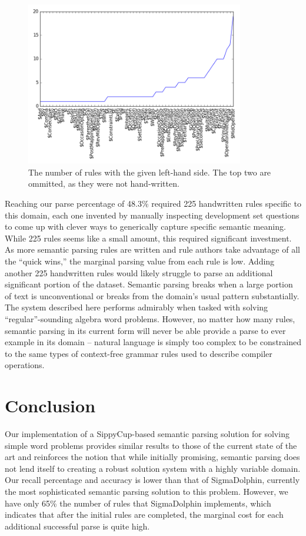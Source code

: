 \documentclass[11pt]{article}
\begin{document}
\begin{figure}[t]
    \centering
    \includegraphics[width=0.85\textwidth]{rules-bottom.png}
    \caption{The number of rules with the given left-hand side. The top two are ommitted, as they were not hand-written.}
    \label{fig:chart}
\end{figure}

Reaching our parse percentage of 48.3\% required 225 handwritten rules specific to this domain, each one invented by manually inspecting development set questions to come up with clever ways to generically capture specific semantic meaning. While 225 rules seems like a small amount, this required significant investment. As more semantic parsing rules are written and rule authors take advantage of all the ``quick wins,'' the marginal parsing value from each rule is low. Adding another 225 handwritten rules would likely struggle to parse an additional significant portion of the dataset.
Semantic parsing breaks when a large portion of text is unconventional or breaks from the domain's usual pattern substantially. The system described here performs admirably when tasked with solving ``regular''-sounding algebra word problems. However, no matter how many rules, semantic parsing in its current form will never be able provide a parse to ever example in its domain -- natural language is simply too complex to be constrained to the same types of context-free grammar rules used to describe compiler operations.


\section{Conclusion}
Our implementation of a SippyCup-based semantic parsing solution for solving simple word problems provides similar results to those of the current state of the art and reinforces the notion that while initially promising, semantic parsing does not lend itself to creating a robust solution system with a highly variable domain. Our recall percentage and accuracy is lower than that of SigmaDolphin, currently the most sophisticated semantic parsing solution to this problem. However, we have only 65\% the number of rules that SigmaDolphin implements, which indicates that after the initial rules are completed, the marginal cost for each additional successful parse is quite high.
\end{document}
